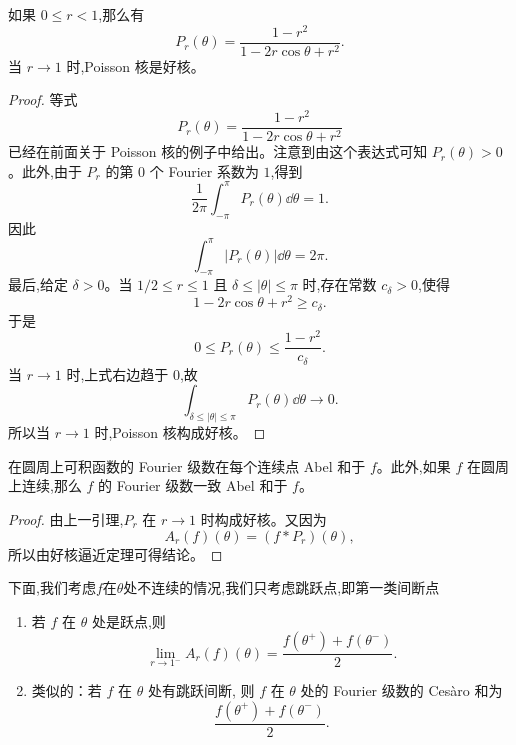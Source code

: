\begin{lemma}
	如果 $0\leq r<1$,那么有
	\[
	P_r(\theta)=\frac{1-r^2}{1-2r\cos\theta+r^2}.
	\]
	当 $r\to1$ 时,Poisson 核是好核。
\end{lemma}

\begin{proof}
	等式
	\[
	P_r(\theta)=\frac{1-r^2}{1-2r\cos\theta+r^2}
	\]
	已经在前面关于 Poisson 核的例子中给出。注意到由这个表达式可知 $P_r(\theta)>0$。此外,由于 $P_r$ 的第 $0$ 个 Fourier 系数为 $1$,得到
	\[
	\frac1{2\pi}\int_{-\pi}^{\pi}P_r(\theta)\dd\theta=1.
	\]
	因此
	\[
	\int_{-\pi}^{\pi}|P_r(\theta)|\dd\theta=2\pi.
	\]
	最后,给定 $\delta>0$。当 $1/2\leq r\leq1$ 且 $\delta\leq |\theta|\leq\pi$ 时,存在常数 $c_\delta>0$,使得
	\[
	1-2r\cos\theta+r^2\geq c_\delta.
	\]
	于是
	\[
	0\leq P_r(\theta)\leq \frac{1-r^2}{c_\delta}.
	\]
	当 $r\to1$ 时,上式右边趋于 $0$,故
	\[
	\int_{\delta\leq |\theta|\leq\pi}P_r(\theta)\dd\theta\to0.
	\]
	所以当 $r\to1$ 时,Poisson 核构成好核。
\end{proof}

\begin{theorem}
	在圆周上可积函数的 Fourier 级数在每个连续点 Abel 和于 $f$。此外,如果 $f$ 在圆周上连续,那么 $f$ 的 Fourier 级数一致 Abel 和于 $f$。
\end{theorem}

\begin{proof}
	由上一引理,$P_r$ 在 $r\to1$ 时构成好核。又因为
	\[
	A_r(f)(\theta)=(f\ast P_r)(\theta),
	\]
	所以由好核逼近定理可得结论。
\end{proof}
下面,我们考虑$f$在$\theta$处不连续的情况,我们只考虑跳跃点,即第一类间断点
\begin{proposition}

	\begin{enumerate}
		\item[(a)] 若 $f$ 在 $\theta$ 处是跃点,则
		\[
		\lim_{r\to1^-}A_r(f)(\theta)
		=\frac{f(\theta^+)+f(\theta^-)}{2}.
		\]
		
		\item[(b)] 类似的：若 $f$ 在 $\theta$ 处有跳跃间断,
		则 $f$ 在 $\theta$ 处的 Fourier 级数的 Ces\`aro 和为
		\[
		\frac{f(\theta^+)+f(\theta^-)}{2}.
		\]
	\end{enumerate}
	
\end{proposition}



